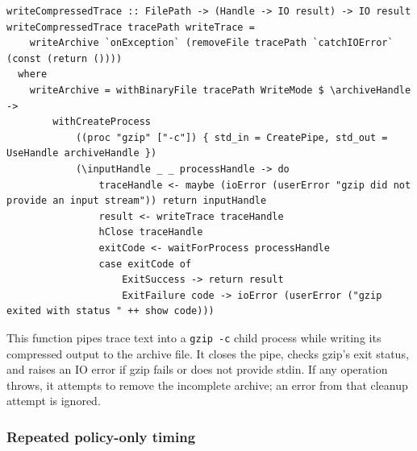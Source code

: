 \documentclass[11pt]{article}
\begin{document}
\begin{lstlisting}
writeCompressedTrace :: FilePath -> (Handle -> IO result) -> IO result
writeCompressedTrace tracePath writeTrace =
    writeArchive `onException` (removeFile tracePath `catchIOError` (const (return ())))
  where
    writeArchive = withBinaryFile tracePath WriteMode $ \archiveHandle ->
        withCreateProcess
            ((proc "gzip" ["-c"]) { std_in = CreatePipe, std_out = UseHandle archiveHandle })
            (\inputHandle _ _ processHandle -> do
                traceHandle <- maybe (ioError (userError "gzip did not provide an input stream")) return inputHandle
                result <- writeTrace traceHandle
                hClose traceHandle
                exitCode <- waitForProcess processHandle
                case exitCode of
                    ExitSuccess -> return result
                    ExitFailure code -> ioError (userError ("gzip exited with status " ++ show code)))
\end{lstlisting}

This function pipes trace text into a \texttt{gzip -c} child process while
writing its compressed output to the archive file. It closes the pipe,
checks gzip's exit status, and raises an IO error if gzip fails or does not
provide stdin. If any operation throws, it attempts to remove the incomplete
archive; an error from that cleanup attempt is ignored.

\subsubsection{Repeated policy-only timing}
\end{document}
